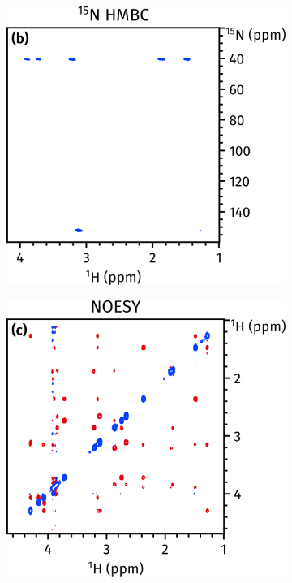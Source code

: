 \documentclass[a4paper,12pt]{article}
\begin{document}
\begin{refsection}
\vspace{1cm}

\begin{figure}[htb]
    \ContinuedFloat
    \begin{subfigure}[b]{\textwidth}
        \centering
        \includegraphics[]{abns_2.png}%
    \end{subfigure}
\end{figure}

\begin{figure}[htb]
    \ContinuedFloat
    \begin{subfigure}[b]{\textwidth}
        \centering
        \includegraphics[]{abns_3.png}%
    \end{subfigure}
\end{figure}


\end{refsection}
\end{document}
